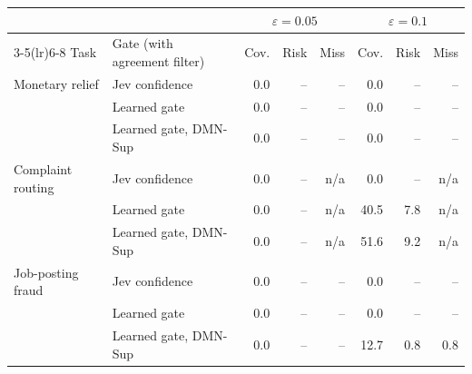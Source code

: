 \begin{tabular}{@{}llrrrrrr@{}}
\toprule
 & & \multicolumn{3}{c}{$\varepsilon=0.05$} & \multicolumn{3}{c}{$\varepsilon=0.1$} \\
\cmidrule(lr){3-5}\cmidrule(lr){6-8}
Task & Gate (with agreement filter) & Cov. & Risk & Miss & Cov. & Risk & Miss \\
\midrule
Monetary relief & Jev confidence & 0.0 & -- & -- & 0.0 & -- & -- \\
 & Learned gate & 0.0 & -- & -- & 0.0 & -- & -- \\
 & Learned gate, DMN-Sup & 0.0 & -- & -- & 0.0 & -- & -- \\
\midrule
Complaint routing & Jev confidence & 0.0 & -- & n/a & 0.0 & -- & n/a \\
 & Learned gate & 0.0 & -- & n/a & 40.5 & 7.8 & n/a \\
 & Learned gate, DMN-Sup & 0.0 & -- & n/a & 51.6 & 9.2 & n/a \\
\midrule
Job-posting fraud & Jev confidence & 0.0 & -- & -- & 0.0 & -- & -- \\
 & Learned gate & 0.0 & -- & -- & 0.0 & -- & -- \\
 & Learned gate, DMN-Sup & 0.0 & -- & -- & 12.7 & 0.8 & 0.8 \\
\bottomrule
\end{tabular}
